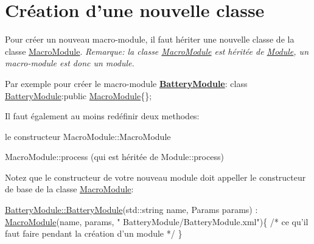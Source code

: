 \hypertarget{docModule_classCreation}{}\section{Création d'une nouvelle classe}\label{docModule_classCreation}
Pour créer un nouveau macro-\/module, il faut hériter une nouvelle classe de la classe \hyperlink{classMacroModule}{Macro\-Module}. {\itshape Remarque\-: la classe \hyperlink{classMacroModule}{Macro\-Module} est héritée de \hyperlink{classModule}{Module}, un macro-\/module est donc un module.}

Par exemple pour créer le macro-\/module {\bfseries \hyperlink{classBatteryModule}{Battery\-Module}}\-: {\ttfamily class \hyperlink{classBatteryModule}{Battery\-Module}\-:public \hyperlink{classMacroModule}{Macro\-Module}\{\};}

Il faut également au moins redéfinir deux methodes\-:
\begin{DoxyEnumerate}
\item le constructeur Macro\-Module\-::\-Macro\-Module
\item Macro\-Module\-::process (qui est héritée de Module\-::process)
\end{DoxyEnumerate}

Notez que le constructeur de votre nouveau module doit appeller le constructeur de base de la classe \hyperlink{classMacroModule}{Macro\-Module}\-:


\begin{DoxyCode}
\hyperlink{classBatteryModule_a2fb494ef5f124c38c0fdf9ccfb31918f}{BatteryModule::BatteryModule}(std::string name, 
      Params params) : \hyperlink{classMacroModule}{MacroModule}(name, params, \textcolor{stringliteral}{"
      BatteryModule/BatteryModule.xml"})\{
    \textcolor{comment}{/* ce qu'il faut faire pendant la création d'un module */}
\}
\end{DoxyCode}


